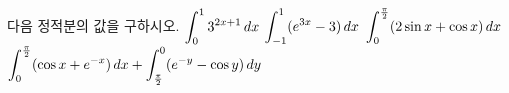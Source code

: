 다음 정적분의 값을 구하시오.
 $\displaystyle\int_{0}^{1}3^{2x+1}\mkern3mu dx$
 $\displaystyle\int_{-1}^{1}(e^{3x}-3)\mkern3mu dx$
 $\displaystyle\int_{0}^{\frac{\pi}{2}}(2\sin x+\cos x)\mkern3mu dx$
 $\displaystyle\int_{0}^{\frac{\pi}{2}}(\cos x+e^{-x})\mkern3mu dx+\int_{\frac{\pi}{2}}^{0}(e^{-y}-\cos y)\mkern3mu dy$
